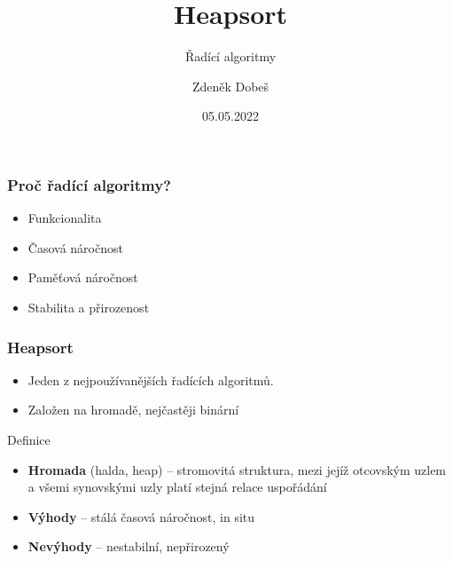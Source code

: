 \documentclass{beamer}
\title{Heapsort}
\subtitle{Řadící algoritmy}
\author{Zdeněk Dobeš}
\institute{VUT FIT}
\date{05.05.2022}
\begin{document}
\frame{\titlepage}

\begin{frame}
\frametitle{Proč řadící algoritmy?}
\begin{itemize}
\setlength\itemsep{1.5em}
 \item<1-> Funkcionalita
 \item<2-> Časová náročnost
 \item<3-> Paměťová náročnost
 \item<4-> Stabilita a přirozenost
\end{itemize}
\end{frame}

\begin{frame}
\frametitle{Heapsort}

\begin{itemize}
\setlength\itemsep{0.3em}
 \item Jeden z nejpoužívanějších řadících algoritmů. 
 \item Založen na \alert{hromadě}, nejčastěji binární
\end{itemize}

\vspace{0.3cm}

\begin{block}{Definice}
\begin{itemize}
\item \textbf{Hromada} (halda, heap) --  stromovitá struktura, mezi jejíž otcovským uzlem a všemi synovskými uzly platí stejná relace uspořádání
\end{itemize}
\end{block}

\pause
\vspace{0.3cm}

\begin{itemize}
\setlength\itemsep{0.3em}
 \item \textbf{Výhody} -- stálá časová náročnost, in situ
 \item \textbf{Nevýhody} -- nestabilní, nepřirozený
\end{itemize}

\end{frame}
\end{document}
